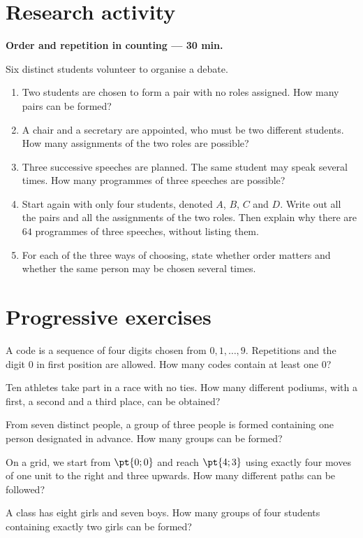\section{Research activity}\textbf{Order and repetition in counting --- 30 min.}\par Six distinct students volunteer to organise a debate.
\begin{enumerate}\item Two students are chosen to form a pair with no roles assigned. How many pairs can be formed?
\item A chair and a secretary are appointed, who must be two different students. How many assignments of the two roles are possible?
\item Three successive speeches are planned. The same student may speak several times. How many programmes of three speeches are possible?
\item Start again with only four students, denoted $A$, $B$, $C$ and $D$. Write out all the pairs and all the assignments of the two roles. Then explain why there are $64$ programmes of three speeches, without listing them.
\item For each of the three ways of choosing, state whether order matters and whether the same person may be chosen several times.\end{enumerate}

\mxnewpage
\section{Progressive exercises}

A code is a sequence of four digits chosen from $0,1,\ldots,9$. Repetitions and the digit $0$ in first position are allowed. How many codes contain at least one $0$?

Ten athletes take part in a race with no ties. How many different podiums, with a first, a second and a third place, can be obtained?

From seven distinct people, a group of three people is formed containing one person designated in advance. How many groups can be formed?

On a grid, we start from $\pt{0;0}$ and reach $\pt{4;3}$ using exactly four moves of one unit to the right and three upwards. How many different paths can be followed?

A class has eight girls and seven boys. How many groups of four students containing exactly two girls can be formed?

